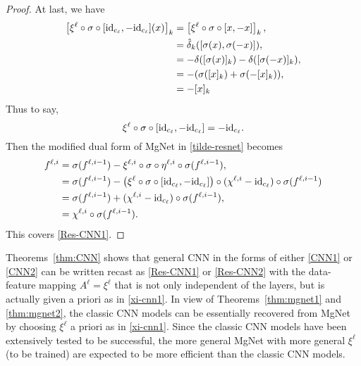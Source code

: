 \begin{proof}
	At last, we have
	\begin{align}
	\left[\xi^{\ell} \circ \sigma \circ [{\rm id}_{c_\ell}, -{\rm id}_{c_\ell}] (x) \right]_k &=  \left[\xi^{\ell} \circ \sigma \circ [x, -x]  \right]_k, \\
	&= \hat \delta_k ( [\sigma(x), \sigma(-x)]),  \\
	&= -\delta([\sigma(x)]_k) - \delta([\sigma(-x)]_k),\\
	&=-( \sigma([x]_k)+ \sigma(-[x]_k)) , \\
	&=  -[x]_k
	\end{align}
	Thus to say,
	\begin{equation}
	\xi^{\ell} \circ \sigma \circ [{\rm id}_{c_\ell}, -{\rm id}_{c_\ell}]  = -{\rm id}_{c_\ell}.
	\end{equation}
	Then the modified dual form of MgNet in \eqref{tilde-resnet} becomes
	\begin{align}
	f^{\ell,i} &= \sigma(f^{\ell,i-1}) - \xi^{\ell,i} \circ \sigma \circ \eta^{\ell,i} \circ\sigma ( f^{\ell,i-1}) , \\
	&=  \sigma(f^{\ell,i-1}) - \left( \xi^{\ell} \circ \sigma \circ [{\rm id}_{c_\ell}, -{\rm id}_{c_\ell}] \right) 
	\circ (\chi^{\ell,i} - {\rm id}_{c_\ell})\circ \sigma(f^{\ell,i-1})\\
	&=\sigma(f^{\ell,i-1}) + (\chi^{\ell,i} -{\rm id}_{c_\ell})\circ \sigma(f^{\ell,i-1}),  \\
	&=\chi^{\ell,i} \circ  \sigma (f^{\ell,i-1}).
	\end{align}
	This covers \eqref{Res-CNN1}.
\end{proof}


\begin{remark}
Theorems~\ref{thm:CNN} shows that general CNN in
the forms of either \eqref{CNN1} or \eqref{CNN2} can be written recast
as \eqref{Res-CNN1} or \eqref{Res-CNN2} with the data-feature mapping 
$A^\ell=\xi^\ell$ that is not only independent of the layers, but is
actually given a priori as in \eqref{xi-cnn1}.  In
view of Theorems~\ref{thm:mgnet1} and \ref{thm:mgnet2}, the classic
CNN models can be essentially recovered from MgNet by choosing
$\xi^\ell$ a priori as in  \eqref{xi-cnn1}.  Since
the classic CNN models have been extensively tested to be successful,
the more general MgNet with more general $\xi^\ell$ (to be trained)
are expected to be more efficient than the classic CNN models. 
\end{remark}

%

